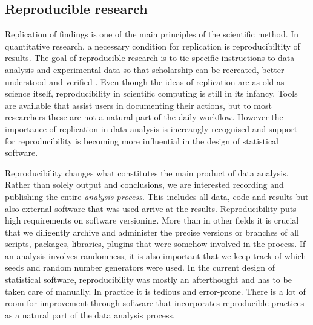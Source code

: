 \subsection{Reproducible research}

Replication of findings is one of the main principles of the scientific method. In quantitative research, a necessary condition for replication is reproducibiltity of results. The goal of reproducible research is to tie specific instructions to data analysis and experimental data so that scholarship can be recreated, better understood and verified \citep{cranRR}. Even though the ideas of replication are as old as science itself, reproducibility in scientific computing is still in its infancy. Tools are available that assist users in documenting their actions, but to most researchers these are not a natural part of the daily workflow. However the importance of replication in data analysis is increangly recognised and support for reproducibility is becoming more influential in the design of statistical software.

Reproducibility changes what constitutes the main product of data analysis. Rather than solely output and conclusions, we are interested recording and publishing the entire \emph{analysis process}. This includes all data, code and results but also external software that was used arrive at the results. Reproducibility puts high requirements on software versioning. More than in other fields it is crucial that we diligently archive and administer the precise versions or branches of all scripts, packages, libraries, plugins that were somehow involved in the process. If an analysis involves randomness, it is also important that we keep track of which seeds and random number generators were used. In the current design of statistical software, reproducibility was mostly an afterthought and has to be taken care of manually. In practice it is tedious and error-prone. There is a lot of room for improvement through software that incorporates reproducible practices as a natural part of the data analysis process.

